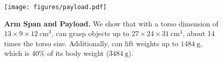 \begin{figure}[t]
  \centering
  \texttt{[image: figures/payload.pdf]}
  \caption{\textbf{Arm Span and Payload.} We show that with a torso dimension of $13 \times 9 \times 12~\mathrm{cm}^3$, \system can grasp objects up to $27 \times 24 \times 31~\mathrm{cm}^3$, about 14 times the torso size. Additionally, \system can lift weights up to $1484~\mathrm{g}$, which is 40\% of its body weight ($3484~\mathrm{g}$).}
  \label{fig:payload}
    \vspace{-3mm}
\end{figure}